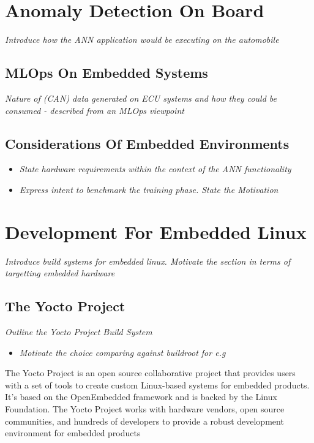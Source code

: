 \section[Anomaly Detection using Machine Learning]{Anomaly Detection On Board}
\textit{Introduce how the ANN application would be executing on the automobile}

\subsection[Machine Learning on Embedded Devices]{MLOps On Embedded Systems}
\textit{Nature of (CAN) data generated on ECU systems and how they could be consumed - described from an MLOps viewpoint }

\subsection[Considerations of Embedded Environments]{Considerations Of Embedded Environments}
\begin{itemize}
	\item \textit{State hardware requirements within the context of the ANN functionality}
	\item \textit{Express intent to benchmark the training phase. State the Motivation}
\end{itemize}

\section[Development Process for Embedded Linux]{Development For Embedded Linux}
\textit{Introduce build systems for embedded linux. Motivate the section in terms of targetting embedded hardware}

\subsection[Build Systems : The Yocto Project]{The Yocto Project}
\textit{Outline the Yocto Project Build System}

\begin{itemize}
	\item \textit{Motivate the choice comparing against buildroot for e.g}
\end{itemize}

The Yocto Project is an open source collaborative project that provides users with a set of tools to create custom Linux-based systems for embedded products. It's based on the OpenEmbedded framework and is backed by the Linux Foundation. The Yocto Project works with hardware vendors, open source communities, and hundreds of developers to provide a robust development environment for embedded products

